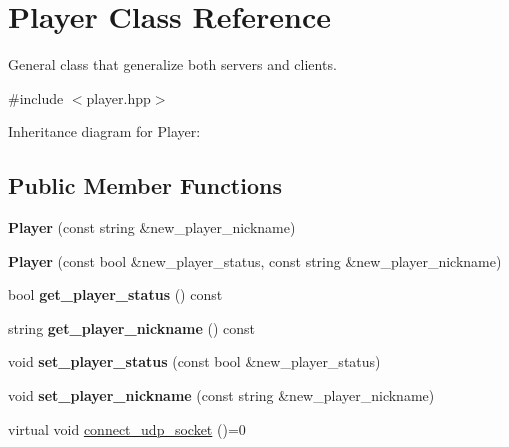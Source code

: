 \hypertarget{classPlayer}{}\section{Player Class Reference}
\label{classPlayer}


General class that generalize both servers and clients.  




{\ttfamily \#include $<$player.\+hpp$>$}



Inheritance diagram for Player\+:
\subsection*{Public Member Functions}
\begin{DoxyCompactItemize}
\item 
\mbox{\label{classPlayer_a20d66b09b00385c7906b98e018ef3bdf}} 
{\bfseries Player} (const string \&new\+\_\+player\+\_\+nickname)
\item 
\mbox{\label{classPlayer_a583e9fd627fc8ff6ebbe2c42841f3245}} 
{\bfseries Player} (const bool \&new\+\_\+player\+\_\+status, const string \&new\+\_\+player\+\_\+nickname)
\item 
\mbox{\label{classPlayer_a6bf741a6aa5a96dfbbe6b317f7947e05}} 
bool {\bfseries get\+\_\+player\+\_\+status} () const
\item 
\mbox{\label{classPlayer_a44973bb240f41f65b11a0342fd463626}} 
string {\bfseries get\+\_\+player\+\_\+nickname} () const
\item 
\mbox{\label{classPlayer_a723b5c80169c1f8d9b6fdf9f23159f40}} 
void {\bfseries set\+\_\+player\+\_\+status} (const bool \&new\+\_\+player\+\_\+status)
\item 
\mbox{\label{classPlayer_a4ca84afc06901a98d589156903c865f6}} 
void {\bfseries set\+\_\+player\+\_\+nickname} (const string \&new\+\_\+player\+\_\+nickname)
\item 
\mbox{\label{classPlayer_aae73825592fcad15da84868bcaca8b1a}} 
virtual void \hyperlink{classPlayer_aae73825592fcad15da84868bcaca8b1a}{connect\+\_\+udp\+\_\+socket} ()=0

\end{DoxyCompactItemize}
